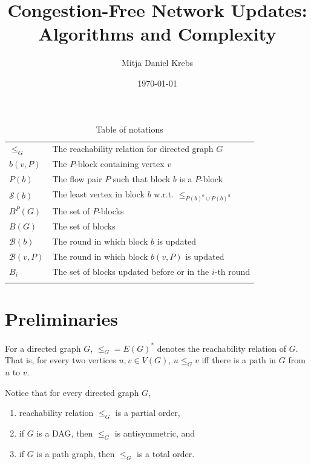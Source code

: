 \documentclass[fontsize=11pt,paper=a4]{book}
\author{Mitja Daniel Krebs}
\date{\today}
\title{Congestion-Free Network Updates: Algorithms and Complexity}
\begin{document}
\maketitle
\tableofcontents

\begin{table}[htbp]
\caption{Table of notations}
\centering
\begin{tabular}{ll}
\hyperref[org5240944]{\(\leq_G\)} & The reachability relation for directed graph \(G\)\\[0pt]
\hyperref[orgfdb53df]{\(b(v,P)\)} & The \(P\)-block containing vertex \(v\)\\[0pt]
\hyperref[org4f059d5]{\(P(b)\)} & The flow pair \(P\) such that block \(b\) is a \(P\)-block\\[0pt]
\hyperref[org1c8b784]{\(\mathcal{S}(b)\)} & The least vertex in block \(b\) w.r.t. \(\leq_{P(b)^o\cup P(b)^u}\)\\[0pt]
\hyperref[orged30f88]{\(B^P(G)\)} & The set of \(P\)-blocks\\[0pt]
\hyperref[org24d9ffb]{\(B(G)\)} & The set of blocks\\[0pt]
\hyperref[org4a6b314]{\(\mathcal{B}(b)\)} & The round in which block \(b\) is updated\\[0pt]
\hyperref[org693df5f]{\(\mathcal{B}(v,P)\)} & The round in which block \(b(v,P)\) is updated\\[0pt]
\hyperref[orgcb11a3f]{\(B_i\)} & The set of blocks updated before or in the \(i\)-th round\\[0pt]
 & \\[0pt]
\end{tabular}
\end{table}

\part{Preliminaries}
\label{sec:org9ffc481}

\begin{notation}
For a directed graph \(G\), \(\leq_G=E(G)^*\) denotes the reachability relation of \(G\).
That is, for every two vertices \(u,v\in V(G)\), \(u\leq_Gv\) iff there is a path in \(G\) from \(u\) to \(v\).
\label{org5240944}
\end{notation}

Notice that for every directed graph \(G\),

\begin{enumerate}
\item reachability relation \(\leq_G\) is a partial order,

\item if \(G\) is a DAG, then \(\leq_G\) is antisymmetric, and

\item if \(G\) is a path graph, then \(\leq_G\) is a total order.
\end{enumerate}
\end{document}
